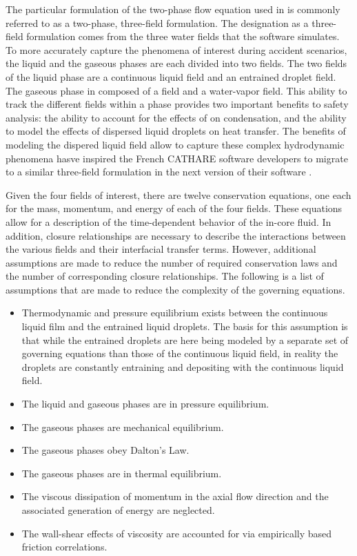 The particular formulation of the two-phase flow equation used in \cobra{} is commonly referred to as a two-phase, three-field formulation.
The designation as a three-field formulation comes from the three water fields that the software simulates. 
To more accurately capture the phenomena of interest during accident scenarios, the liquid and the gaseous phases are each divided into two fields.
The two fields of the liquid phase are a continuous liquid field and an entrained droplet field.
The gaseous phase in composed of a \ncg{} field and a water-vapor field. 
This ability to track the different fields within a phase provides two important benefits to safety analysis: the ability to account for the effects of \ncgs{} on condensation, and the ability to model the effects of dispersed liquid droplets on heat transfer.
The benefits of modeling the dispered liquid field allow to capture these complex hydrodynamic phenomena hasve inspired the French CATHARE software developers to migrate to a similar three-field formulation in the next version of their software \cite{Emonot2011}.

Given the four fields of interest, there are twelve conservation equations, one each for the mass, momentum, and energy of each of the four fields.
These equations allow for a description of the time-dependent behavior of the in-core fluid.
In addition, closure relationships are necessary to describe the interactions between the various fields and their interfacial transfer terms.
However, additional assumptions are made to reduce the number of required conservation laws and the number of corresponding closure relationships.
The following is a list of assumptions that are made to reduce the complexity of the governing equations.

\begin{itemize}
\item{
Thermodynamic and pressure equilibrium exists between the continuous liquid film and the entrained liquid droplets.
The basis for this assumption is that while the entrained droplets are here being modeled by a separate set of governing equations than those of the continuous liquid field, in reality the droplets are constantly entraining and depositing with the continuous liquid field. 
}
\item{
The liquid and gaseous phases are in pressure equilibrium.
}
\item{The gaseous phases are mechanical equilibrium.}
\item{The gaseous phases obey Dalton's Law.}
\item{The gaseous phases are in thermal equilibrium.}
\item{
The viscous dissipation of momentum in the axial flow direction and the associated generation of energy are neglected.
}
\item{
The wall-shear effects of viscosity are accounted for via empirically based friction correlations.
}
\end{itemize}

